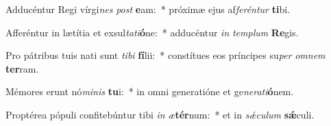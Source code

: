 \item Adducéntur Regi vírgi\textit{nes} \textit{post} \textbf{e}am:~* próximæ ejus af\textit{fe}\textit{rén}\textit{tur} \textbf{ti}bi.
\item Afferéntur in lætítia et exsul\textit{ta}\textit{ti}\textbf{ó}ne:~* adducéntur \textit{in} \textit{tem}\textit{plum} \textbf{Re}gis.
\item Pro pátribus tuis nati sunt \textit{ti}\textit{bi} \textbf{fí}lii:~* constítues eos príncipes su\textit{per} \textit{om}\textit{nem} \textbf{ter}ram.
\item Mémores erunt nó\textit{mi}\textit{nis} \textbf{tu}i:~* in omni generatióne et ge\textit{ne}\textit{ra}\textit{ti}\textbf{ó}nem.
\item Proptérea pópuli confitebúntur tibi \textit{in} \textit{æ}\textbf{tér}num:~* et in \textit{sǽ}\textit{cu}\textit{lum} \textbf{sǽ}culi.
